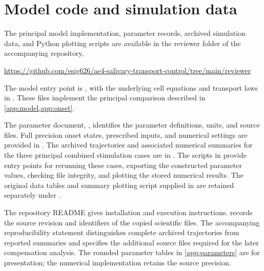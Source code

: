 \section{Model code and simulation data}
\label{app:code}

The principal model implementation, parameter records, archived simulation data, and Python plotting scripts are available in the reviewer folder of the accompanying repository,
\begin{center}
\url{https://github.com/esig626/ae4-salivary-transport-control/tree/main/reviewer}
\end{center}
The model entry point is , with the underlying cell equations and transport laws in . These files implement the principal comparison described in \cref{app:model,app:onset}.

The parameter document, , identifies the parameter definitions, units, and source files. Full precision onset states, prescribed inputs, and numerical settings are provided in . The archived trajectories and associated numerical summaries for the three principal combined stimulation cases are in . The scripts in  provide entry points for rerunning these cases, exporting the constructed parameter values, checking file integrity, and plotting the stored numerical results. The original data tables and summary plotting script supplied in  are retained separately under .

The repository README gives installation and execution instructions.  records the source revision and identifiers of the copied scientific files. The accompanying reproducibility statement distinguishes complete archived trajectories from reported summaries and specifies the additional source files required for the later compensation analysis. The rounded parameter tables in \cref{app:parameters} are for presentation; the numerical implementation retains the source precision.
